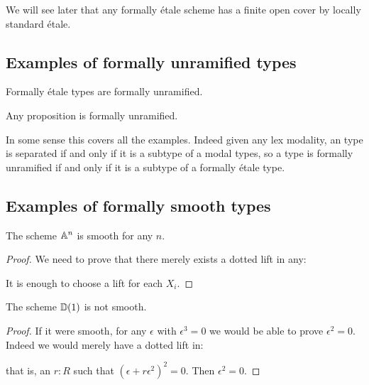 \begin{remark}
We will see later that any formally étale scheme has a finite open cover by locally standard étale. 
\end{remark}


\subsection{Examples of formally unramified types}

\begin{remark}
Formally étale types are formally unramified.
\end{remark}

\begin{remark}
Any proposition is formally unramified.
\end{remark}

\begin{remark}
In some sense this covers all the examples. Indeed given any lex modality, an type is separated if and only if it is a subtype of a modal types, so a type is formally unramified if and only if it is a subtype of a formally étale type. 
\end{remark}


\subsection{Examples of formally smooth types}

\begin{lemma}\label{An-is-smooth}
The scheme $\mathbb{A}^n$ is smooth for any $n$.
\end{lemma}

\begin{proof}
We need to prove that there merely exists a dotted lift in any:
 \begin{center}
    \end{center}
    It is enough to choose a lift for each $X_i$.
\end{proof}

\begin{lemma}
The scheme $\mathbb{D}(1)$ is not smooth.
\end{lemma}

\begin{proof}
If it were smooth, for any $\epsilon$ with $\epsilon^3=0$ we would be able to prove $\epsilon^2=0$.
Indeed we would merely have a dotted lift in:
 \begin{center}
    \end{center}
    that is, an $r:R$ such that $(\epsilon+r\epsilon^2)^2=0$. Then $\epsilon^2=0$.
\end{proof}

